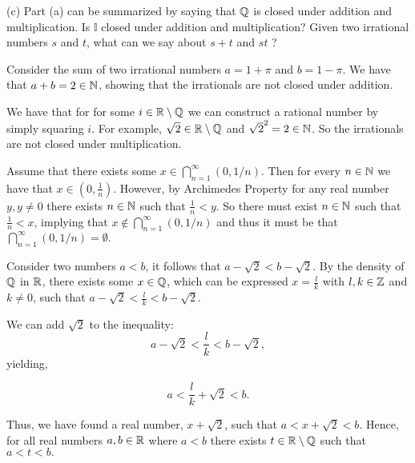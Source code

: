\documentclass{report}
\begin{document}
\par \bigskip
(c) Part (a) can be summarized by saying that $\QQ$ is closed under addition and multiplication. Is $\mathbb{I}$ closed under addition and multiplication? Given two irrational numbers $s$ and $t$, what can we say about $s+t$ and $s t$ ?
\smallskip
\par
\sol 

Consider the sum of two irrational numbers $a = 1 + \pi$ and $b = 1 - \pi.$ We have that $a + b = 2 \in \NN$, showing that the irrationals are not closed under addition.
\par
We have that for for some  $i \in \RR \setminus \QQ$ we can construct a rational number by simply squaring $i.$ For example, $\sqrt{2} \in \RR \setminus \QQ$ and $\sqrt{2}^2= 2 \in \NN$. So the irrationals are not closed under multiplication.

\par \bigskip


Assume that there exists some $x \in \bigcap_{n=1}^{\infty}(0,1 / n).$ Then for every $n \in \NN$ we have that $ x \in (0, \frac{1}{n})$.  However, by Archimedes Property for any real number  $y, y\not= 0$ there exists $n \in \NN$ such that $\frac{1}{n} < y$. So there must exist $n \in \NN$ such that $\frac{1}{n} < x$, implying that $x \not\in \bigcap_{n=1}^{\infty}(0,1 / n)$ and thus it must be that $\bigcap_{n=1}^{\infty}(0,1 / n) = \emptyset.$


\sol Consider two numbers $a <b$, it follows that $a - \sqrt{2} < b - \sqrt{2}.$ By the density of $\QQ$ in $\RR$, there exists some $x \in \QQ$, which can be expressed $x= \frac{l}{k}$ with $l,k \in \ZZ$ and $k \neq 0$, such that $a - \sqrt{2} < \frac{l}{k}< b - \sqrt{2}$.

We can add $\sqrt{2}$ to the inequality:
$$
a - \sqrt{2} < \frac{l}{k}< b - \sqrt{2}
,$$ yielding, 

$$
a < \frac{l}{k}+ \sqrt{2} < b 
.$$ 

Thus, we have found a real number, $x + \sqrt{2}$, such that $a < x + \sqrt{2}< b.$ Hence, for all real numbers $a, b \in \RR$ where $a < b$ there exists $t \in \RR \setminus \QQ$ such that $a<t<b.$
\end{document}
